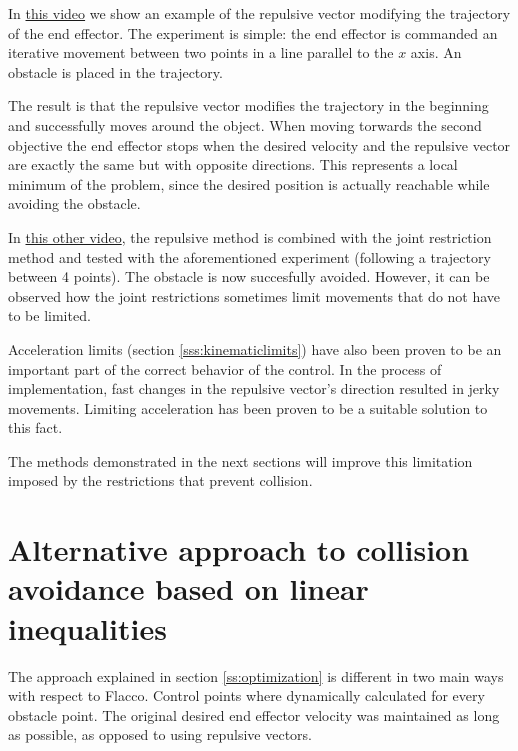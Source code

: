 In \href{https://www.youtube.com/watch?v=wuBuytagogg&list=PLnhdDYfKdsgimnQTQO-bmtKj-KRdbvGgS&index=5&t=0s}{this video} we show an example of the repulsive vector modifying the trajectory of the end effector. The experiment is simple: the end effector is commanded an iterative movement between two points in a line parallel to the $x$ axis. An obstacle is placed in the trajectory.

The result is that the repulsive vector modifies the trajectory in the beginning and successfully moves around the object. When moving torwards the second objective the end effector stops when the desired velocity and the repulsive vector are exactly the same but with opposite directions. This represents a local minimum of the problem, since the desired position is actually reachable while avoiding the obstacle.

In \href{https://www.youtube.com/watch?v=pIpwVOOHptI&list=PLnhdDYfKdsgimnQTQO-bmtKj-KRdbvGgS&index=6&t=0s}{this other video}, the repulsive method is combined with the joint restriction method and tested with the aforementioned experiment (following a trajectory between 4 points). The obstacle is now succesfully avoided. However, it can be observed how the joint restrictions sometimes limit movements that do not have to be limited.

Acceleration limits (section \ref{sss:kinematiclimits}) have also been proven to be an important part of the correct behavior of the control. In the process of implementation, fast changes in the repulsive vector's direction resulted in jerky movements. Limiting acceleration has been proven to be a suitable solution to this fact.

The methods demonstrated in the next sections will improve this limitation imposed by the restrictions that prevent collision.

\section{Alternative approach to collision avoidance based on linear inequalities}

The approach explained in section \ref{ss:optimization} is different in two main ways with respect to Flacco. Control points where dynamically calculated for every obstacle point. The original desired end effector velocity was maintained as long as possible, as opposed to using repulsive vectors.

